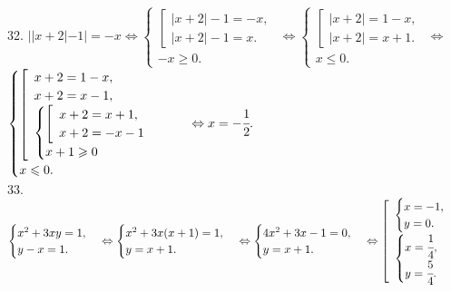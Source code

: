 \documentclass[12pt]{article}
\begin{document}
32. $||x+2|-1|=-x\Leftrightarrow\begin{cases}\left[\begin{array}{l}|x+2|-1=-x,\\ |x+2|-1=x.\end{array}\right.\\ -x\geqslant0.\end{cases}
\Leftrightarrow\begin{cases}\left[\begin{array}{l}|x+2|=1-x,\\ |x+2|=x+1.\end{array}\right.\\ x\leqslant0.\end{cases}
\Leftrightarrow$\\$ \begin{cases}\left[\begin{array}{l}x+2=1-x,\\ x+2=x-1,\\ \begin{cases}\left[\begin{array}{l}x+2=x+1,\\ x+2=-x-1\end{array}\right.\\ x+1\geqslant0\end{cases}\end{array}\right.\\ x\leqslant0.\end{cases}\Leftrightarrow x=-\cfrac{1}{2}.$\\
33. $\begin{cases} x^2+3xy=1,\\ y-x=1.\end{cases}\Leftrightarrow\begin{cases} x^2+3x(x+1)=1,\\ y=x+1.\end{cases}
\Leftrightarrow\begin{cases} 4x^2+3x-1=0,\\ y=x+1.\end{cases}\Leftrightarrow\left[\begin{array}{l}\begin{cases} x=-1,\\ y=0.\end{cases}\\ \begin{cases} x=\cfrac{1}{4},\\ y=\cfrac{5}{4}.\end{cases}\end{array}\right.$\\
\end{document}
